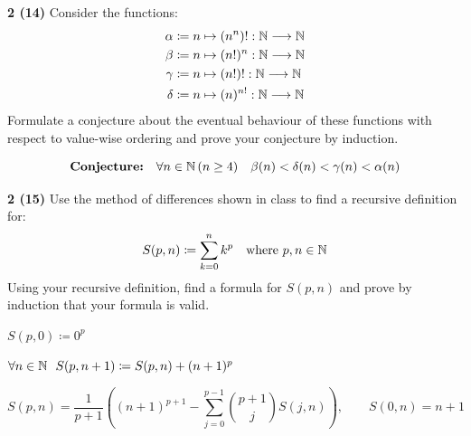 \documentclass[11pt]{article}
\begin{document}
\vspace{8pt}

\newpage

\newpage
{}
\noindent\textbf{2 (14)} \quad Consider the functions:
\begin{align*}
\alpha &\coloneqq n\mapsto(n^n)! : \mathbb{N}\longrightarrow\mathbb{N}\\
\beta &\coloneqq n\mapsto(n!)^n : \mathbb{N}\longrightarrow\mathbb{N}\\
\gamma &\coloneqq n\mapsto(n!)! : \mathbb{N}\longrightarrow\mathbb{N}\\
\delta &\coloneqq n\mapsto(n)^{n!} : \mathbb{N}\longrightarrow\mathbb{N}
\end{align*}
Formulate a conjecture about the eventual behaviour of these functions with respect to value-wise ordering and prove your conjecture by induction.

\vspace{6pt}
$$\textbf{Conjecture:}\quad \forall n\in\mathbb{N}\,(n\geq4) \quad \beta(n) < \delta(n) < \gamma(n) < \alpha(n)$$


\newpage

\newpage
{}
\noindent\textbf{2 (15)} \quad Use the method of differences shown in class to find a recursive definition for:
$$S(p,n)\coloneqq\sum_{k=0}^n k^p \quad\text{where } p,n\in\mathbb{N}$$
Using your recursive definition, find a formula for $S(p,n)$ and prove by induction that your formula is valid.

\vspace{6pt}
\bclabel
\hspace{1em}$S(p,0)\coloneqq0^p$

\rcslabel
\hspace{1em}$\forall n\in\mathbb{N}\ \ S(p,n+1)\coloneqq S(p,n)+(n+1)^p$

$$S(p,n) = \frac{1}{p+1}\left((n+1)^{p+1} - \sum_{j=0}^{p-1}\binom{p+1}{j}S(j,n)\right),\qquad S(0,n)=n+1$$


\newpage

\end{document}
